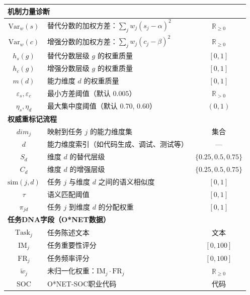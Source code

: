 \begin{longtable}{clc}
\multicolumn{3}{l}{\textbf{机制力量诊断}} \\
\midrule
$\mathrm{Var}_w(s)$ & 替代分数的加权方差：$\sum_j w_j(s_j-\alpha)^2$ & $\mathbb{R}_{\ge 0}$ \\
$\mathrm{Var}_w(c)$ & 增强分数的加权方差：$\sum_j w_j(c_j-\beta)^2$ & $\mathbb{R}_{\ge 0}$ \\
$h_s(g)$ & 替代分数层级 $g$ 的权重质量 & $[0,1]$ \\
$h_c(g)$ & 增强分数层级 $g$ 的权重质量 & $[0,1]$ \\
$m(d)$ & 能力维度 $d$ 的权重质量 & $[0,1]$ \\
$\varepsilon_s,\varepsilon_c$ & 最小方差阈值（默认 $0.005$） & $\mathbb{R}_{>0}$ \\
$\eta_s,\eta_d$ & 最大集中度阈值（默认 $0.70$, $0.60$） & $(0,1)$ \\
\midrule

\multicolumn{3}{l}{\textbf{权威重标记流程}} \\
\midrule
$\textit{dim}_j$ & 映射到任务 $j$ 的能力维度集 & 集合 \\
$d$ & 能力维度索引（如代码生成、调试、测试等） & --- \\
$S_d$ & 维度 $d$ 的替代层级 & $\{0.25,0.5,0.75\}$ \\
$C_d$ & 维度 $d$ 的增强层级 & $\{0.25,0.5,0.75\}$ \\
$\mathrm{sim}(j,d)$ & 任务 $j$ 与维度 $d$ 之间的语义相似度 & $[0,1]$ \\
$\tau$ & 语义匹配阈值 & $[0,1]$ \\
$\pi_{jd}$ & 任务 $j$ 到维度 $d$ 的分配权重 & $[0,1]$ \\
\midrule

\multicolumn{3}{l}{\textbf{任务DNA字段（O*NET数据）}} \\
\midrule
$\text{Task}_j$ & 任务陈述文本 & 文本 \\
$\text{IM}_j$ & 任务重要性评分 & $[0,100]$ \\
$\text{FR}_j$ & 任务频率评分 & $[0,100]$ \\
$\tilde{w}_j$ & 未归一化权重：$\text{IM}_j \cdot \text{FR}_j$ & $\mathbb{R}_{\ge 0}$ \\
SOC & O*NET-SOC职业代码 & 代码 \\

\end{longtable}
